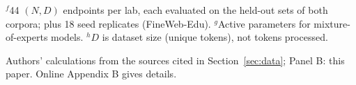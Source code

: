 \begin{table}[tp]
\begin{tablenotes}
$^{f}$44 $(N,D)$ endpoints per lab, each evaluated on the held-out sets of both corpora; plus 18 seed replicates
(FineWeb-Edu).
$^{g}$Active parameters for mixture-of-experts models.
$^{h}$$D$ is dataset size (unique tokens), not tokens processed.
\end{tablenotes}
\begin{tablenotes}[Source]
Authors' calculations from the sources cited in Section~\ref{sec:data}; Panel B: this paper. Online Appendix B gives
details.
\end{tablenotes}
\end{table}
